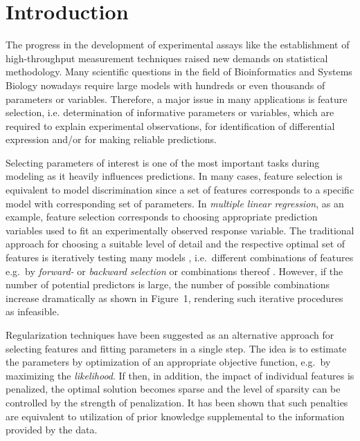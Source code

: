 \documentclass{bioinfo}
\begin{document}
\maketitle

\section{Introduction}
The progress in the development of experimental assays like the establishment of high-throughput measurement techniques raised new demands on statistical methodology. 
Many scientific questions in the field of Bioinformatics and Systems Biology nowadays require large models with hundreds or even thousands of parameters or variables. 
Therefore, a major issue in many applications is feature selection, i.e. determination of informative parameters or variables, which are required to explain experimental observations, for identification of differential expression and/or for making reliable predictions. 

Selecting parameters of interest is one of the most important tasks during modeling as it heavily influences predictions.
In many cases, feature selection is equivalent to model discrimination \citep{Box67} since a set of features corresponds to a specific model with corresponding set of parameters. 
In \emph{multiple linear regression}, as an example, feature selection corresponds to choosing appropriate prediction variables used to fit an experimentally observed response variable. 
The traditional approach for choosing a suitable level of detail and the respective optimal set of features is iteratively testing many models \citep{Thompson1978}, 
i.e.~different combinations of features e.g.~by \emph{forward-} or \emph{backward selection} or combinations thereof \citep{Hocking1967, Efroymson60}. 
However, if the number of potential predictors is large, the number of possible combinations increase dramatically as shown in Figure~1\vphantom{\ref{fig:01}}, rendering such iterative procedures as infeasible. 

Regularization techniques have been suggested as an alternative approach for selecting features and fitting parameters in a single step. 
The idea is to estimate the parameters by optimization of an appropriate objective function, e.g.~by maximizing the \emph{likelihood}. 
If then, in addition, the impact of individual features is penalized, the optimal solution becomes sparse and the level of sparsity can be controlled by the strength of penalization. 
It has been shown that such penalties are equivalent to utilization of prior knowledge supplemental to the information provided by the data. 
\end{document}

